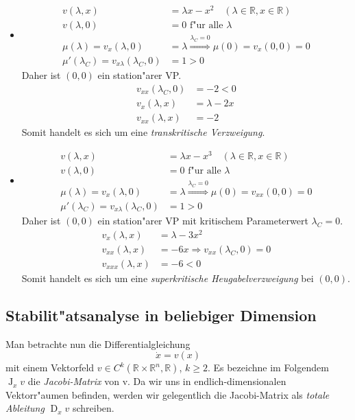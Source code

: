 \documentclass[a4paper, 13pt]{scrreprt}
\theoremstyle{definition} \newtheorem{definition}{Definition}[section]
\newenvironment{beispiel}[1][Beispiel]{\begin{trivlist}
\item[\hskip \labelsep {\bfseries #1}]}{\end{trivlist}}
\newcommand{\RR}{\mathbb{R}}
\begin{document}
\begin{beispiel}
\begin{itemize}
\item
\begin{align*}
v(\lambda,x) &= \lambda x-x^2\quad(\lambda\in\RR,x\in\RR)\\
v(\lambda,0) &= 0\text{ f"ur alle }\lambda\\
\mu(\lambda) = v_x(\lambda,0) &= \lambda \stackrel{\lambda_C = 0}{\Rightarrow}\mu(0) = v_{x}(0,0) = 0\\
\mu'(\lambda_C) = v_{x\lambda}(\lambda_C,0) &=1 > 0
\end{align*}
Daher ist $(0,0)$ ein station"arer VP.
\begin{align*}
v_{xx}(\lambda_C,0) &= -2 < 0\\
v_x(\lambda,x) &= \lambda-2x\\
v_{xx}(\lambda,x) &= -2
\end{align*}
Somit handelt es sich um eine \emph{transkritische Verzweigung}.

\item
\begin{align*}
v(\lambda,x) &= \lambda x-x^3\quad(\lambda\in\RR,x\in\RR)\\
v(\lambda,0) &= 0\text{ f"ur alle }\lambda\\
\mu(\lambda) = v_x(\lambda,0) &= \lambda \stackrel{\lambda_C = 0}{\Rightarrow}\mu(0) = v_{xx}(0,0) = 0\\
\mu'(\lambda_C) = v_{x\lambda}(\lambda_C,0) &=1 > 0
\end{align*}
Daher ist $(0,0)$ ein station"arer VP mit kritischem Parameterwert $\lambda_C = 0$.
\begin{align*}
v_x(\lambda,x) &= \lambda - 3x^2\\
v_{xx}(\lambda,x) &= -6x\Rightarrow v_{xx}(\lambda_C,0) = 0\\
v_{xxx}(\lambda,x) &= -6 < 0
\end{align*}
Somit handelt es sich um eine \emph{superkritische Heugabelverzweigung} bei $(0,0)$.
\end{itemize}
\end{beispiel}

\subsection{Stabilit"atsanalyse in beliebiger Dimension}
Man betrachte nun die Differentialgleichung 
$$\dot x = v(x)$$
mit einem Vektorfeld $v\in C^k(\RR \times \RR^n, \RR)$, $k\geq 2$. Es bezeichne im Folgendem $\operatorname{J}_xv$ die \emph{Jacobi-Matrix} von v. Da wir uns in endlich-dimensionalen Vektorr"aumen befinden, werden wir gelegentlich die Jacobi-Matrix als \emph{totale Ableitung} $\operatorname{D}_xv$ schreiben.
\end{document}

